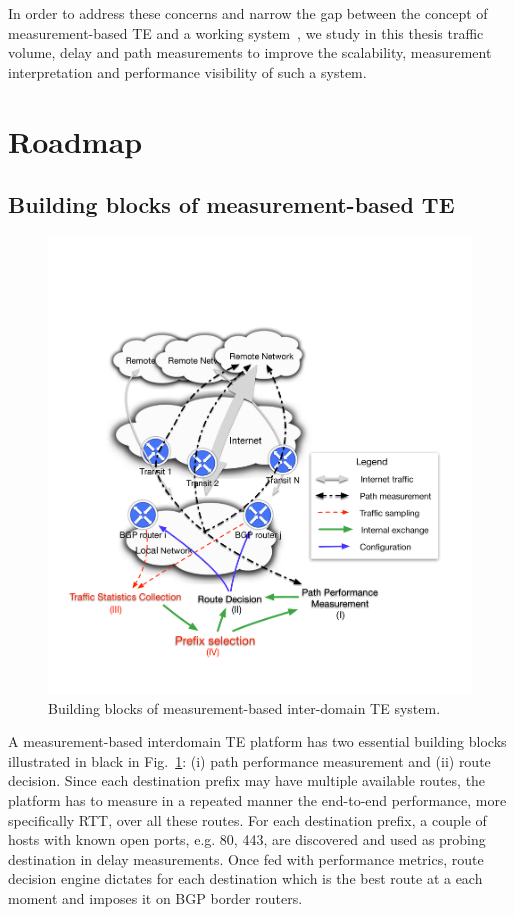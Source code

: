 In order to address these concerns and narrow the gap between the concept of measurement-based TE and a working system~\cite{b6}, we 
study in this thesis traffic volume, delay and path measurements to improve the scalability, measurement interpretation and performance visibility of such a system.


\section{Roadmap}
\subsection{Building blocks of measurement-based TE}

\begin{figure}[!htb]
\centering
\includegraphics[width=\textwidth]{gfx/chap1/archi.pdf}
\caption{Building blocks of measurement-based inter-domain TE system.}
\label{fig:archi}
\end{figure}

A measurement-based interdomain TE platform has two essential building blocks illustrated in black in Fig.~\ref{fig:archi}: (i) path performance measurement and (ii) route decision.
Since each destination prefix may have multiple available routes, the platform has to measure in a repeated manner the end-to-end performance, more specifically \acf{RTT}, over all these routes. 
For each destination prefix, a couple of hosts with known open ports, e.g. 80, 443, are discovered and used as probing destination in delay measurements.
Once fed with performance metrics, route decision engine dictates for each destination which is the best route at a each moment and imposes it on BGP border routers.

